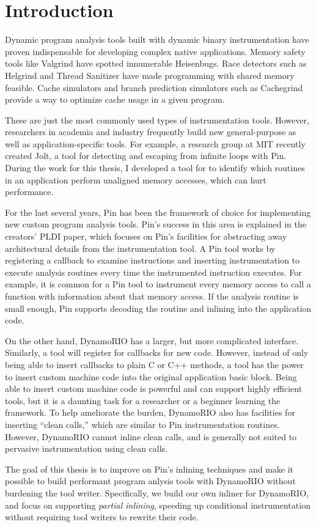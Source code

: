 \chapter{Introduction}

Dynamic program analysis tools built with dynamic binary instrumentation have
proven indispensable for developing complex native applications.  Memory safety
tools like Valgrind\cite{valgrind} have spotted innumerable Heisenbugs.  Race
detectors such as Helgrind\cite{helgrind} and Thread Sanitizer\cite{tsan} have
made programming with shared memory feasible.  Cache simulators and branch
prediction simulators such as Cachegrind\cite{valgrind_workloads} provide a way
to optimize cache usage in a given program.

These are just the most commonly used types of instrumentation tools.  However,
researchers in academia and industry frequently build new general-purpose as
well as application-specific tools.  For example, a research group at MIT
recently created Jolt\cite{jolt}, a tool for detecting and escaping from
infinite loops with Pin.  During the work for this thesis, I developed a tool
for to identify which routines in an application perform unaligned memory
accesses, which can hurt performance.

For the last several years, Pin\cite{pin} has been the framework of choice for
implementing new custom program analysis tools.  Pin's success in this area is
explained in the creators' PLDI paper, which focuses on Pin's facilities for
abstracting away architectural details from the instrumentation tool.  A Pin
tool works by registering a callback to examine instructions and inserting
instrumentation to execute analysis routines every time the instrumented
instruction executes.  For example, it is common for a Pin tool to instrument
every memory access to call a function with information about that memory
access.  If the analysis routine is small enough, Pin supports decoding the
routine and inlining into the application code.

On the other hand, DynamoRIO\cite{bruening_phd} has a larger, but more
complicated interface.  Similarly, a tool will register for callbacks for new
code.  However, instead of only being able to insert callbacks to plain C or C++
methods, a tool has the power to insert custom machine code into the original
application basic block.  Being able to insert custom machine code is powerful
and can support highly efficient tools, but it is a daunting task for a
researcher or a beginner learning the framework.  To help ameliorate the
burden, DynamoRIO also has facilities for inserting ``clean calls,'' which are
similar to Pin instrumentation routines.  However, DynamoRIO cannot inline clean
calls, and is generally not suited to pervasive instrumentation using clean
calls.

The goal of this thesis is to improve on Pin's inlining techniques and make it
possible to build performant program anlysis tools with DynamoRIO without
burdening the tool writer.  Specifically, we build our own inliner for
DynamoRIO, and focus on supporting {\em partial inlining}, speeding up
conditional instrumentation without requiring tool writers to rewrite their
code.
